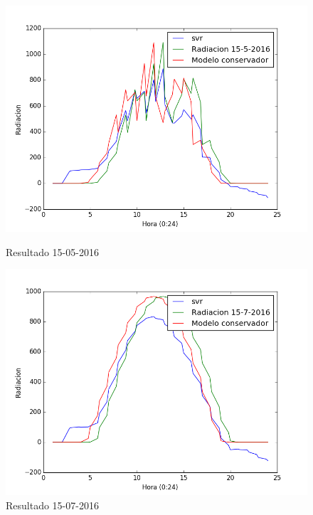 \begin{figure}[htb]
%
		\includegraphics[width=\linewidth]{figures/svr_2016051520160515.png}
		\caption{Resultado 15-05-2016 \label{resultado_svr_3}}
\endminipage\hfill
{}%
		\includegraphics[width=\linewidth]{figures/svr_2016071520160715.png}
		\caption{Resultado 15-07-2016 \label{resultado_svr_4}}
\endminipage\hfill
\end{figure}
